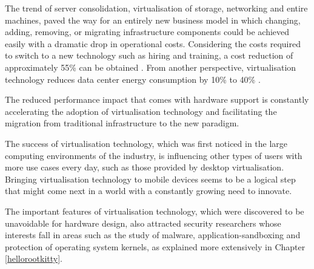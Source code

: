 The trend of server consolidation, virtualisation of storage, networking and entire machines, paved the way for an entirely new business model in which changing, adding, removing, or migrating infrastructure components could be achieved easily with a dramatic drop in operational costs. Considering the costs required to switch to a new technology such as hiring and training, a cost reduction of approximately 55\% can be obtained \cite{costvirt}. From another perspective, virtualisation technology reduces data center energy consumption by 10\% to 40\% \cite{costvirt2}. %

The reduced performance impact that comes with hardware support is constantly accelerating the adoption of virtualisation technology and facilitating the migration from traditional infrastructure to the new paradigm.

The success of virtualisation technology, which was first noticed in the large computing environments of the industry, is influencing other types of users with more use cases every day, such as those provided by desktop virtualisation. %
Bringing virtualisation technology to mobile devices seems to be a logical step that might come next in a world with a constantly growing need to innovate. %

The important features of virtualisation technology, which were discovered to be unavoidable for hardware design, also attracted security researchers whose interests fall in areas such as the study of malware, application-sandboxing and protection of operating system kernels, as explained more extensively in Chapter \ref{hellorootkitty}.  %


